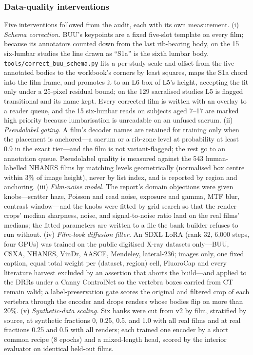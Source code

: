 \documentclass[11pt,letterpaper]{article}
\begin{document}
\subsubsection*{Data-quality interventions}
Five interventions followed from the audit, each with its own measurement. (i) \emph{Schema correction.} BUU's keypoints are a fixed five-slot template on every film; because its annotators counted down from the last rib-bearing body, on the 15 six-lumbar studies the line drawn as ``S1a'' is the sixth lumbar body. \texttt{tools/correct\_buu\_schema.py} fits a per-study scale and offset from the five annotated bodies to the workbook's corners by least squares, maps the S1a chord into the film frame, and promotes it to an L6 box of L5's height, accepting the fit only under a 25-pixel residual bound; on the 129 sacralised studies L5 is flagged transitional and its name kept. Every corrected film is written with an overlay to a reader queue, and the 15 six-lumbar reads on subjects aged 7--17 are marked high priority because lumbarisation is unreadable on an unfused sacrum. (ii) \emph{Pseudolabel gating.} A film's decoder names are retained for training only when the placement is anchored---a sacrum or a rib-zone level at probability at least 0.9 in the exact tier---and the film is not variant-flagged; the rest go to an annotation queue. Pseudolabel quality is measured against the 543 human-labelled NHANES films by matching levels geometrically (normalised box centre within 3\% of image height), never by list index, and is reported by region and anchoring. (iii) \emph{Film-noise model.} The report's domain objections were given knobs---scatter haze, Poisson and read noise, exposure and gamma, MTF blur, contrast window---and the knobs were fitted by grid search so that the render crops' median sharpness, noise, and signal-to-noise ratio land on the real films' medians; the fitted parameters are written to a file the bank builder refuses to run without. (iv) \emph{Film-look diffusion filter.} An SDXL LoRA (rank 32, 6,000 steps, four GPUs) was trained on the public digitised X-ray datasets only---BUU, CSXA, NHANES, VinDr, AASCE, Mendeley, lateral-236; images only, one fixed caption, equal total weight per (dataset, region) cell, FluoroCap and every literature harvest excluded by an assertion that aborts the build---and applied to the DRRs under a Canny ControlNet so the vertebra boxes carried from CT remain valid; a label-preservation gate scores the original and filtered crop of each vertebra through the encoder and drops renders whose bodies flip on more than 20\%. (v) \emph{Synthetic-data scaling.} Six banks were cut from v2 by film, stratified by source, at synthetic fractions 0, 0.25, 0.5, and 1.0 with all real films and at real fractions 0.25 and 0.5 with all renders; each trained one encoder by a short common recipe (8 epochs) and a mixed-length head, scored by the interior evaluator on identical held-out films.
\end{document}
